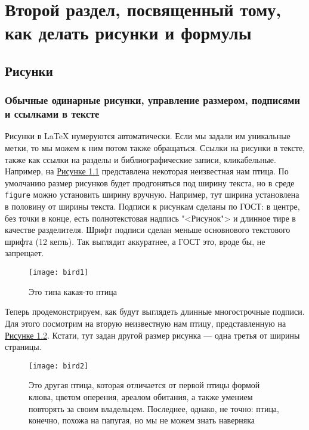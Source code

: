 \thispagestyle{empty}
\chapter{Второй раздел, посвященный тому, как делать рисунки и формулы}
\label{ch:chap2}

\section{Рисунки}
\label{sec:fig}

\subsection{Обычные одинарные рисунки, управление размером, подписями и ссылками в тексте}
\label{subsec:simp-fig}

Рисунки в \LaTeX{} нумеруются автоматически. Если мы задали им уникальные метки, то мы можем к ним потом также обращаться. Ссылки на рисунки в тексте, также как ссылки на разделы и библиографические записи, кликабельные. Например, на \hyperref[fig:bird1]{Рисунке \ref*{fig:bird1}} представлена некоторая неизвестная нам птица. По умолчанию размер рисунков будет продгоняться под ширину текста, но в среде \verb|figure| можно установить ширину вручную. Например, тут ширина установлена в половину от ширины текста. Подписи к рисункам сделаны по ГОСТ: в центре, без точки в конце, есть полнотекстовая надпись "<Рисунок"> и длинное тире в качестве разделителя. Шрифт подписи сделан меньше основнового текстового шрифта (12 кегль). Так выглядит аккуратнее, а ГОСТ это, вроде бы, не запрещает.

    \begin{figure}[ht]
        \centering
        \texttt{[image: bird1]}
        \caption{Это типа какая-то птица}
        \label{fig:bird1}
    \end{figure}

Теперь продемонстрируем, как будут выглядеть длинные многострочные подписи. Для этого посмотрим на вторую неизвестную нам птицу, представленную на \hyperref[fig:bird2]{Рисунке \ref*{fig:bird2}}. Кстати, тут задан другой размер рисунка --- одна третья от ширины страницы.

    \begin{figure}[ht]
        \centering
        \texttt{[image: bird2]}
        \caption{Это другая птица, которая отличается от первой птицы формой клюва, цветом оперения, ареалом обитания, а также умением повторять за своим владельцем. Последнее, однако, не точно: птица, конечно, похожа на папугая, но мы не можем знать наверняка}
        \label{fig:bird2}
    \end{figure}

